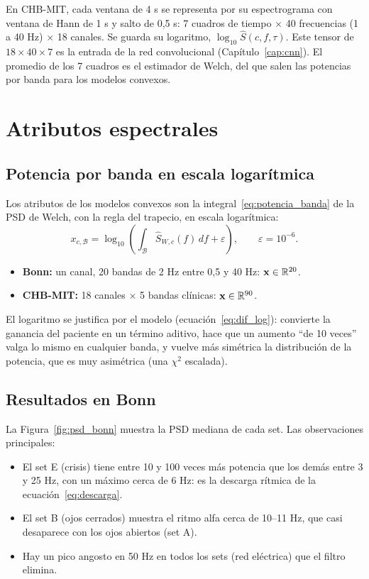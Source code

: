 En CHB-MIT, cada ventana de 4 s se representa por su espectrograma con ventana de Hann de 1 s y salto
de 0,5 s: 7 cuadros de tiempo $\times$ 40 frecuencias (1 a 40 Hz) $\times$ 18 canales. Se guarda su
logaritmo, $\log_{10}\hat S(c, f, \tau)$. Este tensor de $18 \times 40 \times 7$ es la entrada de la red
convolucional (Capítulo~\ref{cap:cnn}). El promedio de los 7 cuadros es el estimador de Welch, del que
salen las potencias por banda para los modelos convexos.

\section{Atributos espectrales}

\subsection{Potencia por banda en escala logarítmica}

Los atributos de los modelos convexos son la integral~\eqref{eq:potencia_banda} de la PSD de Welch, con la
regla del trapecio, en escala logarítmica:
\begin{equation}
  x_{c,\mathcal{B}} = \log_{10}\!\left(\int_{\mathcal{B}} \hat S_{W,c}(f)\, df + \varepsilon\right),
  \qquad \varepsilon = 10^{-6}.
\end{equation}
\begin{itemize}
  \item \textbf{Bonn:} un canal, 20 bandas de 2 Hz entre 0,5 y 40 Hz: $\mathbf{x} \in \mathbb{R}^{20}$.
  \item \textbf{CHB-MIT:} 18 canales $\times$ 5 bandas clínicas: $\mathbf{x} \in \mathbb{R}^{90}$.
\end{itemize}
El logaritmo se justifica por el modelo (ecuación~\eqref{eq:dif_log}): convierte la ganancia del paciente
en un término aditivo, hace que un aumento ``de 10 veces'' valga lo mismo en cualquier banda, y vuelve más
simétrica la distribución de la potencia, que es muy asimétrica (una $\chi^2$ escalada).

\subsection{Resultados en Bonn}

La Figura~\ref{fig:psd_bonn} muestra la PSD mediana de cada set. Las observaciones principales:
\begin{itemize}
  \item El set E (crisis) tiene entre 10 y 100 veces más potencia que los demás entre 3 y 25 Hz, con un
        máximo cerca de 6 Hz: es la descarga rítmica de la ecuación~\eqref{eq:descarga}.
  \item El set B (ojos cerrados) muestra el ritmo alfa cerca de 10--11 Hz, que casi desaparece con los ojos
        abiertos (set A).
  \item Hay un pico angosto en 50 Hz en todos los sets (red eléctrica) que el filtro elimina.
\end{itemize}

